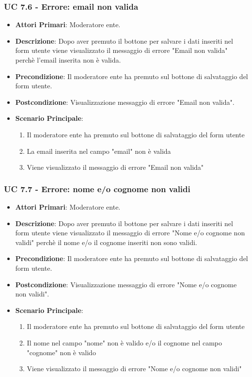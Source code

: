 			\subsubsection{UC 7.6 - Errore: email non valida}
			\begin{itemize}
				\item \textbf{Attori Primari}: Moderatore ente.
				\item \textbf{Descrizione}: Dopo aver premuto il bottone per salvare i dati inseriti nel form utente viene visualizzato il messaggio di errore "Email non valida" perchè l'email inserita non è valida. 
				\item \textbf{Precondizione}: Il moderatore ente ha premuto sul bottone di salvataggio del form utente.
				\item \textbf{Postcondizione}: Visualizzazione messaggio di errore "Email non valida".
				\item \textbf{Scenario Principale}:
				\begin{enumerate}
					\item{Il moderatore ente ha premuto sul bottone di salvataggio del form utente}
					\item{La email inserita nel campo "email" non è valida}
					\item{Viene visualizzato il messaggio di errore "Email non valida"}
				\end{enumerate}	
			\end{itemize}
			
			\subsubsection{UC 7.7 - Errore: nome e/o cognome non validi}
			\begin{itemize}
				\item \textbf{Attori Primari}: Moderatore ente.
				\item \textbf{Descrizione}: Dopo aver premuto il bottone per salvare i dati inseriti nel form utente viene visualizzato il messaggio di errore "Nome e/o cognome non validi" perchè il nome e/o il cognome inseriti non sono validi. 
				\item \textbf{Precondizione}: Il moderatore ente ha premuto sul bottone di salvataggio del form utente.
				\item \textbf{Postcondizione}: Visualizzazione messaggio di errore "Nome e/o cognome non validi".
				\item \textbf{Scenario Principale}:
				\begin{enumerate}
					\item{Il moderatore ente ha premuto sul bottone di salvataggio del form utente}
					\item{Il nome nel campo "nome" non è valido e/o il cognome nel campo "cognome" non è valido}
					\item{Viene visualizzato il messaggio di errore "Nome e/o cognome non validi"}
				\end{enumerate}	
			\end{itemize}
